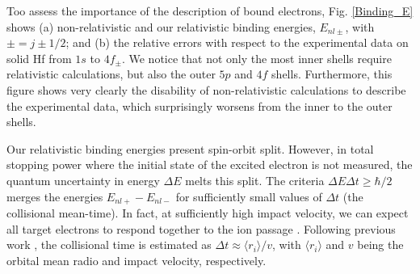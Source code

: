 \documentclass[aps,pra,reprint,groupedaddress]{revtex4-1}
\begin{document}
Too assess the importance of the description of bound electrons, Fig. \ref{Binding_E} shows (a) non-relativistic \cite{badnell97} and our relativistic binding energies, $E_{nl\pm}$, with $\pm=j\pm1/2$; and (b) the relative errors with respect to the experimental data on solid Hf \cite{williams1995} from $1s$ to $4f_{\pm}$. We notice that not only the most inner shells require relativistic calculations, but also the outer $5p$ and $4f$ shells. 
Furthermore, this figure shows very clearly the disability of non-relativistic calculations to describe the experimental data, which surprisingly worsens from the inner to the outer shells. 


Our relativistic binding energies present spin-orbit split. However, in total stopping power where the initial state of the excited electron is not measured, the quantum uncertainty in energy $\Delta E$ melts this split. The criteria $\Delta E\Delta t \geq \hbar /2$ merges the energies  $E_{nl+} - E_{nl-}$ for sufficiently small values of $\Delta t$ (the collisional mean-time). In fact, at sufficiently high impact velocity, we can expect all target electrons to respond together to the ion passage \cite{lindhard53,chu72}. Following previous work \cite{mon09}, the collisional time is estimated as $\Delta t \approx \langle r_i\rangle/v$, with $\langle r_i\rangle$ and $v$ being the orbital mean radio and impact velocity, respectively. 
\end{document}
